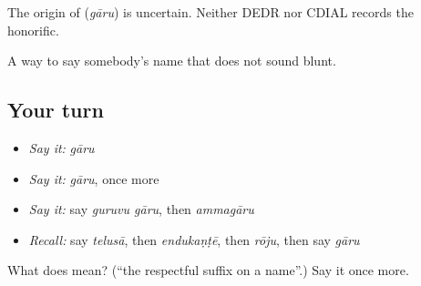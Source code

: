 \begin{cousinweb}
The origin of \textbf{} (\emph{gāru}) is uncertain. Neither DEDR nor CDIAL records the honorific.
\end{cousinweb}

\begin{grammarlens}[title={What you've built}]
A way to say somebody's name that does not sound blunt.
\end{grammarlens}

\subsection*{Your turn}
\begin{itemize}
\raggedright
  \item \emph{Say it:} \emph{gāru}
  \item \emph{Say it:} \emph{gāru}, once more
  \item \emph{Say it:} say \emph{guruvu gāru}, then \emph{ammagāru}
  \item \emph{Recall:} say \emph{telusā}, then \emph{endukaṇṭē}, then \emph{rōju}, then say \emph{gāru}
\end{itemize}

\begin{tcolorbox}[breakable,colback=teal!4,colframe=teal!35!black,title={Before you move on}]
What does  mean? (\textquotedblleft{}the respectful suffix on a name\textquotedblright{}.) Say it once more.
\end{tcolorbox}
